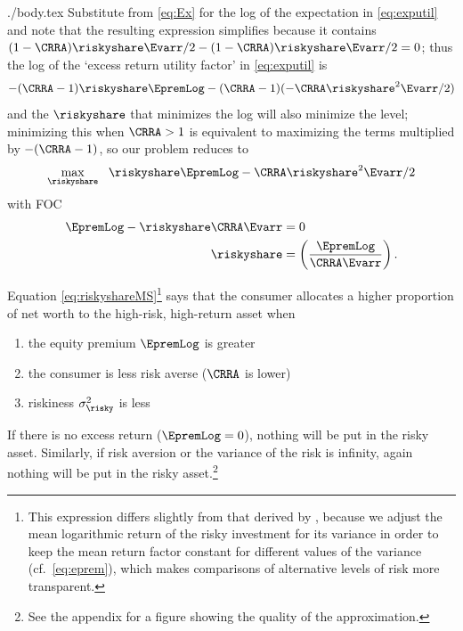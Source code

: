\documentclass{\handout}
\begin{document}
\begin{verbatimwrite}{./body.tex}
Substitute from \eqref{eq:Ex} for the log of the expectation in
\eqref{eq:exputil} and note that the resulting expression simplifies because it contains
${(1-\CRRA)\riskyshare\Evarr/2-(1-\CRRA)\riskyshare\Evarr/2}=0$; 
thus the log of the `excess return utility factor' in \eqref{eq:exputil} is
\begin{equation}
  -(\CRRA-1)\riskyshare \EpremLog - (\CRRA-1)(- \CRRA \riskyshare^{2}\Evarr/2)
\end{equation}
and the $\riskyshare$ that minimizes the log will also
minimize the level; minimizing this when $\CRRA>1$ is equivalent to
maximizing the terms multiplied by $-(\CRRA-1)$, so our problem
reduces to
\begin{equation*}\begin{gathered}\begin{aligned}
\max_{\riskyshare}~~ \riskyshare \EpremLog -\CRRA\riskyshare^{2}\Evarr/2 
\end{aligned}\end{gathered}\end{equation*}
with FOC \hypertarget{riskyshareMS}{} 
\begin{equation}\begin{gathered}\begin{aligned}
         \EpremLog-\riskyshare\CRRA\Evarr  & =  0  \label{eq:riskyshareMS} \\ 
\riskyshare & =  \left(\frac{\EpremLog}{\CRRA \Evarr}\right) .
\end{aligned}\end{gathered}\end{equation}

Equation \eqref{eq:riskyshareMS}\footnote{This expression differs
  slightly from that derived by \cite{cvAppendix}, because we adjust
  the mean logarithmic return of the risky investment for its variance
  in order to keep the mean return factor constant for different values of the variance (cf.\ \eqref{eq:eprem}), which makes
  comparisons of alternative levels of risk more transparent.}  says that the
consumer allocates a higher proportion of net worth to the high-risk, high-return
asset when
\begin{enumerate}
\item the equity premium $\EpremLog$ is greater
\item the consumer is less risk averse ($\CRRA$ is lower)
\item riskiness $\sigma^{2}_{\risky}$ is less
\end{enumerate}
If there is no excess return ($\EpremLog = 0$), nothing will be put in the risky asset.  Similarly, if 
risk aversion or the variance of the risk is infinity, again nothing 
will be put in the risky asset.\footnote{See the appendix for a figure
  showing the quality of the approximation.}


\end{verbatimwrite}
\end{document}
